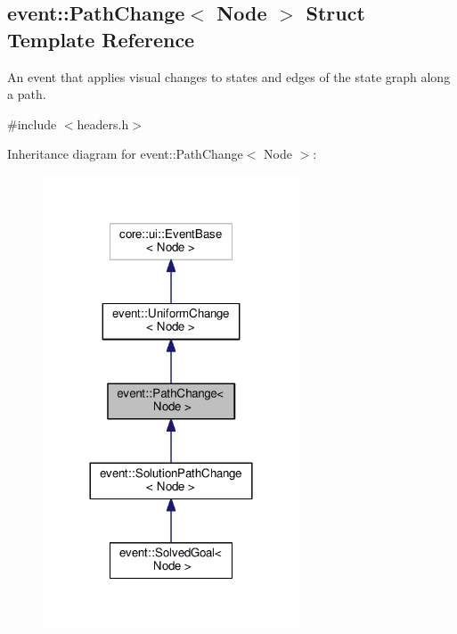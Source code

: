 \hypertarget{structevent_1_1PathChange}{}\subsection{event\+:\+:Path\+Change$<$ Node $>$ Struct Template Reference}
\label{structevent_1_1PathChange}


An event that applies visual changes to states and edges of the state graph along a path.  




{\ttfamily \#include $<$headers.\+h$>$}



Inheritance diagram for event\+:\+:Path\+Change$<$ Node $>$\+:\nopagebreak
\begin{figure}[H]
\begin{center}
\leavevmode
\includegraphics[width=216pt]{structevent_1_1PathChange__inherit__graph}
\end{center}
\end{figure}


